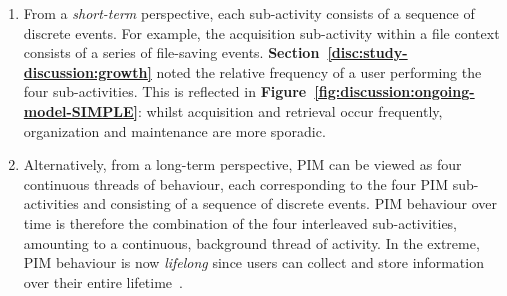 \begin{enumerate}

\item From a \textit{short-term} perspective, each sub-activity consists of a sequence of discrete events. For example, the acquisition sub-activity within a file context consists of a series of file-saving events. 
\textbf{Section~\ref{disc:study-discussion:growth}} noted the relative frequency of a user performing the four sub-activities. This is reflected in \textbf{Figure~\ref{fig:discussion:ongoing-model-SIMPLE}}: whilst acquisition and retrieval occur frequently, organization and maintenance are more sporadic.

\item Alternatively, from a long-term perspective, PIM can be viewed as four continuous threads of behaviour, each corresponding to the four PIM sub-activities and consisting of a sequence of discrete events.  PIM behaviour over time is therefore the combination of the four interleaved sub-activities, amounting to a continuous, background thread of activity.   In the extreme, PIM behaviour is now \textit{lifelong} since users can collect and store information over their entire lifetime~\citep{bell:02,dix:02}.  

\end{enumerate}


